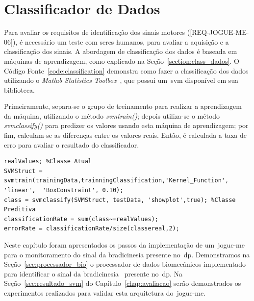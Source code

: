 \section{Classificador de Dados}
Para avaliar os requisitos de identificação dos sinais motores ([REQ-JOGUE-ME-06]), é necessário um teste com seres humanos, para avaliar a aquisição e a classificação dos sinais. A abordagem de classificação dos dados é baseada em máquinas de aprendizagem, como explicado na Seção~\ref{section:class_dados}. O Código Fonte~\ref{code:classification} demonstra como fazer a classificação dos dados utilizando o \textit{Matlab Statistics Toolbox}~\cite{matlab2011}, que possui um~\ac{svm} disponível em sua biblioteca.

Primeiramente, separa-se o grupo de treinamento para realizar a aprendizagem da máquina, utilizando o método \textit{svmtrain()}; depois utiliza-se o método \textit{svmclassify()} para predizer os valores usando esta máquina de aprendizagem; por fim, calculam-se as diferenças entre os valores reais. Então, é calculada a taxa de erro para avaliar o resultado do classificador.

\begin{lstlisting}[frame=single, caption=Uso de Máquina de Vetor de Suporte para Classificação dos Dados, label=code:classification]
realValues; %Classe Atual
SVMStruct = svmtrain(trainingData,trainningClassification,'Kernel_Function', 'linear',	'BoxConstraint', 0.10);
class = svmclassify(SVMStruct, testData, 'showplot',true); %Classe Preditiva
classificationRate = sum(class~=realValues);
errorRate = classificationRate/size(classereal,2);
\end{lstlisting}

Neste capítulo foram apresentados os passos da implementação de um~\ac{jogue-me} para o monitoramento do sinal da bradicinesia presente no~\ac{dp}. Demonstramos na Seção~\ref{sec:processador_bio} o processador de dados biomecânicos implementado para identificar o sinal da bradicinesia~\cite{protpar010} presente no~\ac{dp}. Na Seção~\ref{sec:resultado_svm} do Capítulo~\ref{chap:avaliacao} serão demonstrados os experimentos realizados para validar esta arquitetura do~\ac{jogue-me}.

